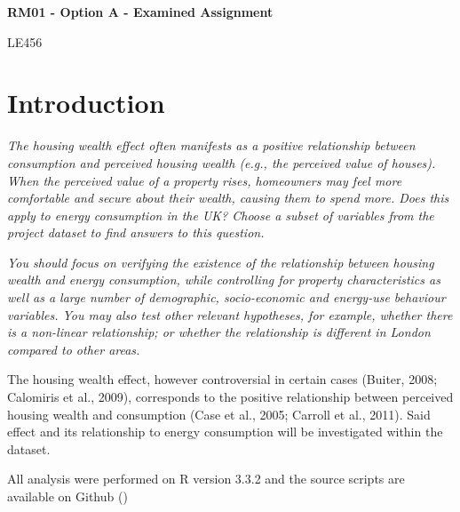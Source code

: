 \documentclass[12pt]{article}
\begin{document}
\makeatletter
\thispagestyle{empty}
	\begin{center}
		\vspace*{-1cm}
		\noindent\hrulefill
		\vspace{0.5cm}
		
		\begin{minipage}[c]{0.7\textwidth}
			\bf\Large\centering
			RM01 - Option A - Examined Assignment\end{minipage}

		\vspace{0.5cm}
		\noindent\hrulefill	
		\vspace{0.5cm}
		
		{
			LE456 
			\vspace{0.5cm}			
		}
	\end{center}
\makeatother

\section{Introduction}

\textit{The housing wealth effect often manifests as a positive relationship between consumption and perceived housing wealth (e.g., the perceived value of houses). When the perceived value of a property rises, homeowners may feel more comfortable and secure about their wealth, causing them to spend more. Does this apply to energy consumption in the UK? Choose a subset of variables from the project dataset to find answers to this question.}

\textit{You should focus on verifying the existence of the relationship between housing wealth and energy consumption, while controlling for property characteristics as well as a large number of demographic, socio-economic and energy-use behaviour variables. You may also test other relevant hypotheses, for example, whether there is a non-linear relationship; or whether the relationship is different in London compared to other areas.}

The housing wealth effect, however controversial in certain cases (Buiter, 2008; Calomiris et al., 2009), corresponds to the positive relationship between perceived housing wealth and consumption (Case et al., 2005; Carroll et al., 2011). Said effect and its relationship to energy consumption will be investigated within the dataset.

All analysis were performed on R version 3.3.2 and the source scripts are available on Github ()
\end{document}
